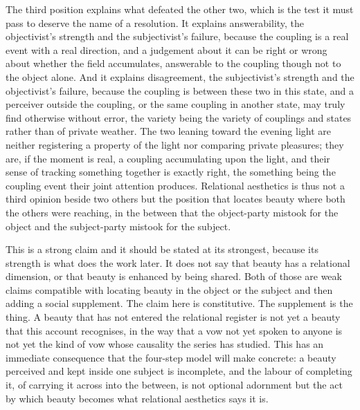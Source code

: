 The third position explains what defeated the other two, which is the test it must pass to deserve the name of a resolution. It explains answerability, the objectivist's strength and the subjectivist's failure, because the coupling is a real event with a real direction, and a judgement about it can be right or wrong about whether the field accumulates, answerable to the coupling though not to the object alone. And it explains disagreement, the subjectivist's strength and the objectivist's failure, because the coupling is between these two in this state, and a perceiver outside the coupling, or the same coupling in another state, may truly find otherwise without error, the variety being the variety of couplings and states rather than of private weather. The two leaning toward the evening light are neither registering a property of the light nor comparing private pleasures; they are, if the moment is real, a coupling accumulating upon the light, and their sense of tracking something together is exactly right, the something being the coupling event their joint attention produces. Relational aesthetics is thus not a third opinion beside two others but the position that locates beauty where both the others were reaching, in the between that the object-party mistook for the object and the subject-party mistook for the subject.


This is a strong claim and it should be stated at its strongest, because its strength is what does the work later. It does not say that beauty has a relational dimension, or that beauty is enhanced by being shared. Both of those are weak claims compatible with locating beauty in the object or the subject and then adding a social supplement. The claim here is constitutive. The supplement is the thing. A beauty that has not entered the relational register is not yet a beauty that this account recognises, in the way that a vow not yet spoken to anyone is not yet the kind of vow whose causality the series has studied. This has an immediate consequence that the four-step model will make concrete: a beauty perceived and kept inside one subject is incomplete, and the labour of completing it, of carrying it across into the between, is not optional adornment but the act by which beauty becomes what relational aesthetics says it is.

